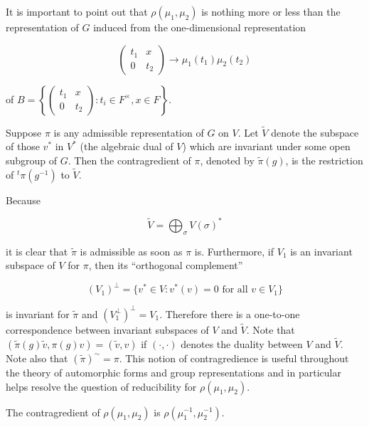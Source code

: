 It is important to point out that $\rho(\mu_1, \mu_2)$ is nothing more or less than the representation of $G$ induced from the one-dimensional representation

\[
\begin{pmatrix} t_1 & x \\ 0 & t_2 \end{pmatrix} \to \mu_1(t_1)\mu_2(t_2)
\]

of $B = \left\{\begin{pmatrix} t_1 & x \\ 0 & t_2 \end{pmatrix}: t_i \in F^{\times}, x \in F\right\}$.

\begin{definition}\label{def:4.16}

Suppose $\pi$ is any admissible representation of $G$ on $V$. Let $\tilde{V}$ denote the subspace of those $v^{*}$ in $V^{*}$ (the algebraic dual of $V$) which are invariant under some open subgroup of $G$. Then the contragredient of $\pi$, denoted by $\tilde{\pi}(g)$, is the restriction of ${}^{t}\pi(g^{-1})$ to $\tilde{V}$.

\end{definition}

Because

\[
\tilde{V} = \bigoplus_{\sigma} V(\sigma)^{*}
\]

it is clear that $\tilde{\pi}$ is admissible as soon as $\pi$ is. Furthermore, if $V_1$ is an invariant subspace of $V$ for $\pi$, then its ``orthogonal complement''

\[
(V_1)^{\perp} = \{v^{*} \in V: v^{*}(v) = 0 \text{ for all } v \in V_1\}
\]

is invariant for $\tilde{\pi}$ and $(V_1^{\perp})^{\perp} = V_1$. Therefore there is a one-to-one correspondence between invariant subspaces of $V$ and $\tilde{V}$. Note that $(\tilde{\pi}(g)\tilde{v}, \pi(g)v) = (\tilde{v}, v)$ if $(\cdot, \cdot)$ denotes the duality between $V$ and $\tilde{V}$. Note also that $(\tilde{\pi})^{\sim} = \pi$. This notion of contragredience is useful throughout the theory of automorphic forms and group representations and in particular helps resolve the question of reducibility for $\rho(\mu_1, \mu_2)$.

\begin{lemma}\label{lem:4.17}

The contragredient of $\rho(\mu_1, \mu_2)$ is $\rho(\mu_1^{-1}, \mu_2^{-1})$.

\end{lemma}

